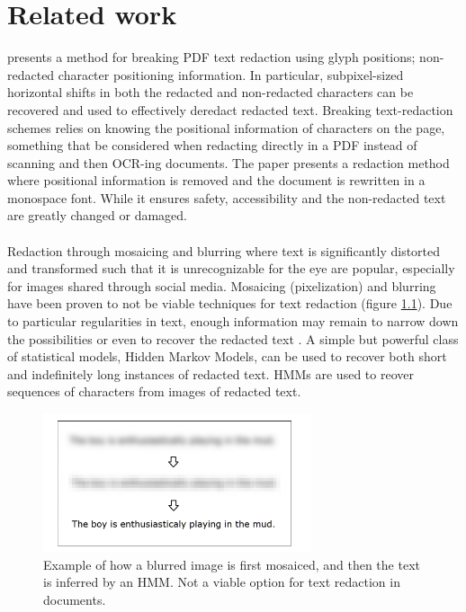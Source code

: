 \chapter{Related work}

\cite{bland2022story} presents a method for breaking PDF text redaction using glyph positions; non-redacted character positioning information. In particular, subpixel-sized horizontal shifts in both the redacted and non-redacted characters can be recovered and used to effectively deredact redacted text. Breaking text-redaction schemes relies on knowing the positional information of characters on the page, something that be considered when redacting directly in a PDF instead of scanning and then OCR-ing documents. The paper presents a redaction method where positional information is removed and the document is rewritten in a monospace font. While it ensures safety, accessibility and the non-redacted text are greatly changed or damaged. 
\\\\
Redaction through mosaicing and blurring where text is significantly distorted and transformed such that it is unrecognizable for the eye are popular, especially for images shared through social media. Mosaicing (pixelization) and blurring have been proven to not be viable techniques for text redaction (figure \ref{fig:blurredredaction}). Due to particular regularities in text, enough information may remain to narrow down the possibilities or even to recover the redacted text \cite{hill2016effectiveness}. A simple but powerful class of statistical models, Hidden Markov Models, can be used to recover both short and indefinitely long instances of redacted text. HMMs are used to reover sequences of characters from images of redacted text. 
\begin{figure}[h]
\includegraphics[width=0.7\textwidth]{latex/media/blurredRedaction.png}
\centering
\caption{Example of how a blurred image is first mosaiced, and then the text is inferred by an HMM. Not a viable option for text redaction in documents.}
\label{fig:blurredredaction}
\end{figure}\\
